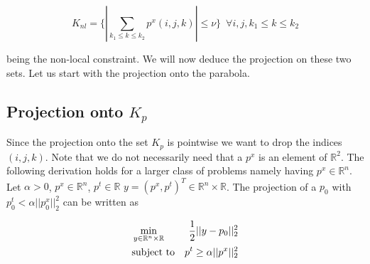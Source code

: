     \begin{equation}
        K_{nl} = \bigg\{ \left| \sum_{k_{1} \le k \le k_{2}} p^{x}(i, j, k) \right| \le \nu \bigg\} \,\,\, \forall i, j, k_{1} \le k \le k_{2} \label{eq:nonlocal}
    \end{equation}

    being the non-local constraint. We will now deduce the projection on these two sets. Let us start with the projection onto the parabola.

    \subsection{Projection onto $K_{p}$}

        Since the projection onto the set $K_{p}$ is pointwise we want to drop the indices $(i, j, k)$. Note that we do not necessarily need that a $p^{x}$ is an element of $\mathbb{R}^{2}$. The following derivation holds for a larger class of problems namely having $p^{x} \in \mathbb{R}^{n}$.
            Let $\alpha > 0$, $p^{x} \in \mathbb{R}^{n}$, $p^{t} \in \mathbb{R}$ %
            $y = (p^{x}, p^{t})^{T} \in \mathbb{R}^{n} \times \mathbb{R}$.
            The projection of a $p_{0}$ with $p_{0}^{t} < \alpha ||p_{0}^{x}||_{2}^{2}$ can be written as

            \begin{eqnarray}
                &\min\limits_{y \in \mathbb{R}^{n} \times \mathbb{R}}& \frac{1}{2} ||y - p_{0}||_{2}^{2} \notag \\
                &\textnormal{subject to}& p^{t} \ge \alpha||p^{x}||_{2}^{2} \notag
            \end{eqnarray}


